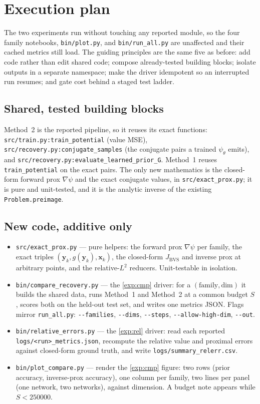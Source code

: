 \documentclass[11pt]{article}
\theoremstyle{definition}
\theoremstyle{remark}
\def\bx {\boldsymbol{x}}
\def\by {\boldsymbol{y}}
\def\JBVS {J_{\text{BVS}}}
\def\psiNN {\psi_{\theta}}
\begin{document}
\section{Execution plan}
\label{sec:execution}

The two experiments run without touching any reported module, so the four family notebooks, \texttt{bin/plot.py}, and \texttt{bin/run\_all.py} are unaffected and their cached metrics still load.
The guiding principles are the same five as before: add code rather than edit shared code; compose already-tested building blocks; isolate outputs in a separate namespace; make the driver idempotent so an interrupted run resumes; and gate cost behind a staged test ladder.

\subsection{Shared, tested building blocks}
\label{sub:blocks}

Method~2 is the reported pipeline, so it reuses its exact functions: \texttt{src/train.py:train\_potential} (value MSE), \texttt{src/recovery.py:conjugate\_samples} (the conjugate pairs a trained $\psiNN$ emits), and \texttt{src/recovery.py:evaluate\_learned\_prior\_G}.
Method~1 reuses \texttt{train\_potential} on the exact pairs.
The only new mathematics is the closed-form forward prox $\nabla\psi$ and the exact conjugate values, in \texttt{src/exact\_prox.py}; it is pure and unit-tested, and it is the analytic inverse of the existing \texttt{Problem.preimage}.

\subsection{New code, additive only}
\label{sub:code}

\begin{itemize}
\item \texttt{src/exact\_prox.py} --- pure helpers: the forward prox $\nabla\psi$ per family, the exact triples $(\by_{k}, g(\by_{k}), \bx_{k})$, the closed-form $\JBVS$ and inverse prox at arbitrary points, and the relative-$L^{2}$ reducers. Unit-testable in isolation.
\item \texttt{bin/compare\_recovery.py} --- the \cref{exp:cmp} driver: for a $(\text{family},\text{dim})$ it builds the shared data, runs Method~1 and Method~2 at a common budget $S$, scores both on the held-out test set, and writes one metrics JSON. Flags mirror \texttt{run\_all.py}: \texttt{-{}-families}, \texttt{-{}-dims}, \texttt{-{}-steps}, \texttt{-{}-allow-high-dim}, \texttt{-{}-out}.
\item \texttt{bin/relative\_errors.py} --- the \cref{exp:rel} driver: read each reported \texttt{logs/<run>\_metrics.json}, recompute the relative value and proximal errors against closed-form ground truth, and write \texttt{logs/summary\_relerr.csv}.
\item \texttt{bin/plot\_compare.py} --- render the \cref{exp:cmp} figure: two rows (prior accuracy, inverse-prox accuracy), one column per family, two lines per panel (one network, two networks), against dimension. A budget note appears while $S < 250000$.
\end{itemize}
\end{document}
